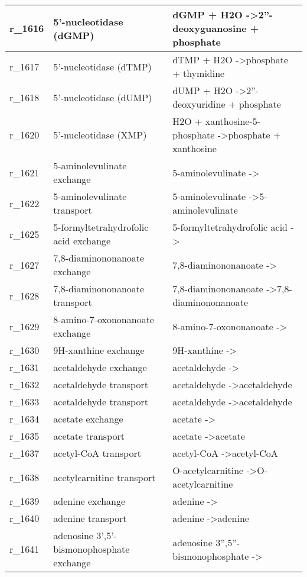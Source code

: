 \begin{landscape}
{\begin{longtable}{|l|p{7cm}|p{15cm}|}
r\_1616 & 5'-nucleotidase (dGMP) & dGMP + H2O  -\textgreater 2''-deoxyguanosine + phosphate \\ \hline
r\_1617 & 5'-nucleotidase (dTMP) & dTMP + H2O  -\textgreater phosphate + thymidine \\ \hline
r\_1618 & 5'-nucleotidase (dUMP) & dUMP + H2O  -\textgreater 2''-deoxyuridine + phosphate \\ \hline
r\_1620 & 5'-nucleotidase (XMP) & H2O + xanthosine-5-phosphate  -\textgreater phosphate + xanthosine \\ \hline
r\_1621 & 5-aminolevulinate exchange & 5-aminolevulinate  -\textgreater{} \\ \hline
r\_1622 & 5-aminolevulinate transport & 5-aminolevulinate  -\textgreater 5-aminolevulinate \\ \hline
r\_1625 & 5-formyltetrahydrofolic acid exchange & 5-formyltetrahydrofolic acid  -\textgreater{} \\ \hline
r\_1627 & 7,8-diaminononanoate exchange & 7,8-diaminononanoate  -\textgreater{} \\ \hline
r\_1628 & 7,8-diaminononanoate transport & 7,8-diaminononanoate  -\textgreater 7,8-diaminononanoate \\ \hline
r\_1629 & 8-amino-7-oxononanoate exchange & 8-amino-7-oxononanoate  -\textgreater{} \\ \hline
r\_1630 & 9H-xanthine exchange & 9H-xanthine  -\textgreater{} \\ \hline
r\_1631 & acetaldehyde exchange & acetaldehyde  -\textgreater{} \\ \hline
r\_1632 & acetaldehyde transport & acetaldehyde  -\textgreater acetaldehyde \\ \hline
r\_1633 & acetaldehyde transport & acetaldehyde  -\textgreater acetaldehyde \\ \hline
r\_1634 & acetate exchange & acetate  -\textgreater{} \\ \hline
r\_1635 & acetate transport & acetate  -\textgreater acetate \\ \hline
r\_1637 & acetyl-CoA transport & acetyl-CoA  -\textgreater acetyl-CoA \\ \hline
r\_1638 & acetylcarnitine transport & O-acetylcarnitine  -\textgreater O-acetylcarnitine \\ \hline
r\_1639 & adenine exchange & adenine  -\textgreater{} \\ \hline
r\_1640 & adenine transport & adenine  -\textgreater adenine \\ \hline
r\_1641 & adenosine 3',5'-bismonophosphate exchange & adenosine 3'',5''-bismonophosphate  -\textgreater{} \\ \hline

\end{longtable}}
\end{landscape}
